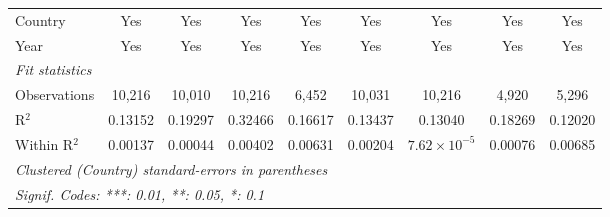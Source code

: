 \begin{tabular}{lcccccccc}
   Country                       & Yes            & Yes      & Yes      & Yes             & Yes             & Yes                   & Yes      & Yes\\  
   Year                          & Yes            & Yes      & Yes      & Yes             & Yes             & Yes                   & Yes      & Yes\\  
   \midrule
   \emph{Fit statistics}\\
   Observations                  & 10,216         & 10,010   & 10,216   & 6,452           & 10,031          & 10,216                & 4,920    & 5,296\\  
   R$^2$                         & 0.13152        & 0.19297  & 0.32466  & 0.16617         & 0.13437         & 0.13040               & 0.18269  & 0.12020\\  
   Within R$^2$                  & 0.00137        & 0.00044  & 0.00402  & 0.00631         & 0.00204         & $7.62\times 10^{-5}$  & 0.00076  & 0.00685\\  
   \midrule \midrule
   \multicolumn{9}{l}{\emph{Clustered (Country) standard-errors in parentheses}}\\
   \multicolumn{9}{l}{\emph{Signif. Codes: ***: 0.01, **: 0.05, *: 0.1}}\\
\end{tabular}
\par\endgroup


